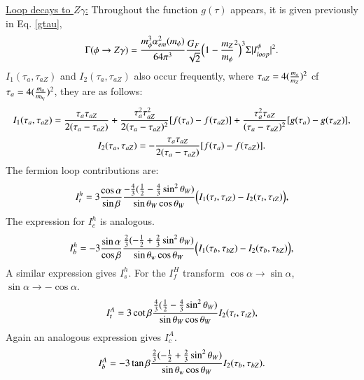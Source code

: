 \documentclass[final,3p,times]{elsarticle}
\begin{document}
\underline{Loop decays to $Z \gamma$:}
Throughout the function $g(\tau)$ appears, it is given previously in Eq. \eqref{gtau},
\begin{equation} \label{phiZgam}
\Gamma(\phi \rightarrow Z \gamma) = {m_{\phi}^3 \alpha_{em}^2(m_{\phi}) \over 64 \pi^3} {G_{F} \over \sqrt{2}} \Big(1-{m_Z \over m_\phi}^2\Big)^3  \Sigma|I_{loop}^{\phi}|^2.
\end{equation}
$I_1(\tau_{a},\tau_{aZ})$ and $I_2(\tau_{a},\tau_{aZ})$ also occur frequently, where $\tau_{aZ} = 4({m_{a} \over m_{Z}})^2$ cf $\tau_{a} = 4({m_{a} \over m_{h_i}})^2$, they are as follows:
\begin{equation}
I_{1}(\tau_{a},\tau_{aZ}) = {\tau_{a} \tau_{aZ} \over 2 (\tau_{a}-\tau_{aZ})} + {\tau_{a}^2 \tau_{aZ}^2 \over 2(\tau_{a}-\tau_{aZ})^2}[f(\tau_{a})-f(\tau_{aZ})] + {\tau_{a}^2 \tau_{aZ} \over (\tau_{a}-\tau_{aZ})^2}[g(\tau_{a})-g(\tau_{aZ})],
\end{equation}
\begin{equation}
I_{2}(\tau_{a},\tau_{aZ}) = -{\tau_{a} \tau_{aZ} \over 2(\tau_{a}-\tau_{aZ})}[f(\tau_{a})-f(\tau_{aZ})].
\end{equation}
The fermion loop contributions are:
\begin{equation}
I_{t}^h = 3 {\cos\alpha \over \sin\beta}{-{4\over 3}({1\over2} - {4 \over 3}\sin^2 \theta_W) \over \sin\theta_W \cos\theta_W} \Big(I_{1}(\tau_t,\tau_{tZ}) -I_{2}(\tau_t,\tau_{tZ})\Big),
\end{equation}
The expression for $I_{c}^h$ is analogous.
\begin{equation}
I_{b}^h = -3{\sin\alpha \over \cos\beta}{{2 \over 3}(-{1\over 2}+{2\over 3}\sin^2 \theta_W) \over \sin\theta_w \cos\theta_W}\Big(I_{1}(\tau_b,\tau_{bZ}) -I_{2}(\tau_b,\tau_{bZ})\Big) ,
\end{equation}
A similar expression gives $I_{s}^h$.
For the $I_{f}^H$ transform $\cos\alpha \rightarrow \sin\alpha$, $\sin\alpha \rightarrow -\cos\alpha$.
\begin{equation}
I_{t}^A = 3 \cot\beta{{4\over 3}({1\over2} - {4 \over 3}\sin^2 \theta_W) \over \sin\theta_W \cos\theta_W} I_{2}(\tau_t,\tau_{tZ}),
\end{equation}
Again an analogous expression gives $I_{c}^A$.
\begin{equation}
I_{b}^A = -3\tan\beta{{2 \over 3}(-{1\over 2}+{2\over 3}\sin^2 \theta_W) \over \sin\theta_w \cos\theta_W}I_{2}(\tau_b,\tau_{bZ}).
\end{equation}
\end{document}
